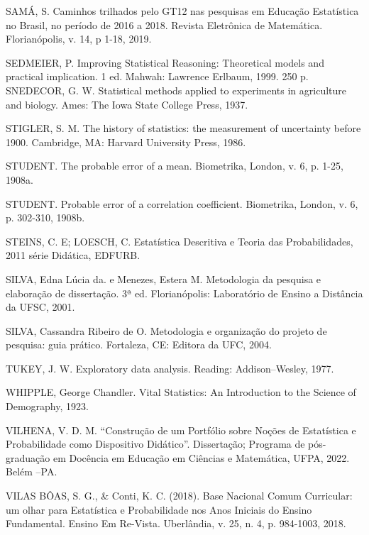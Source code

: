 SAMÁ, S. Caminhos trilhados pelo GT12 nas pesquisas em Educação Estatística no Brasil, no período de 2016 a 2018. Revista Eletrônica de Matemática. Florianópolis, v. 14, p 1-18, 2019.\vskip0.3cm

SEDMEIER, P. Improving Statistical Reasoning: Theoretical models and practical implication. 1 ed. Mahwah: Lawrence Erlbaum, 1999. 250 p.\vskip0.3cm
SNEDECOR, G. W. Statistical methods applied to experiments in agriculture and biology. Ames: The Iowa State College Press, 1937. \vskip0.3cm

STIGLER, S. M. The history of statistics: the measurement of uncertainty before 1900. Cambridge, MA: Harvard University Press, 1986. \vskip0.3cm

STUDENT. The probable error of a mean. Biometrika, London, v. 6, p. 1-25, 1908a.\vskip0.3cm

STUDENT. Probable error of a correlation coefficient. Biometrika, London, v. 6, p. 302-310, 1908b.\vskip0.3cm

STEINS, C. E; LOESCH, C. Estatística Descritiva e Teoria das Probabilidades, 2011 série Didática, EDFURB.\vskip0.3cm

SILVA, Edna Lúcia da. e Menezes, Estera M. Metodologia da pesquisa e elaboração de dissertação. 3ª ed. Florianópolis: Laboratório de Ensino a Distância da UFSC, 2001.\vskip0.3cm

SILVA, Cassandra Ribeiro de O. Metodologia e organização do projeto de pesquisa: guia prático. Fortaleza, CE: Editora da UFC, 2004.\vskip0.3cm

TUKEY, J. W. Exploratory data analysis. Reading: Addison–Wesley, 1977.\vskip0.3cm

WHIPPLE, George Chandler. Vital Statistics: An Introduction to the Science of Demography, 1923. \vskip0.3cm

VILHENA, V. D. M. “Construção de um Portfólio sobre Noções de Estatística e Probabilidade como Dispositivo Didático”. Dissertação; Programa de pós-graduação em Docência em Educação em Ciências e Matemática, UFPA, 2022. Belém –PA.\vskip0.3cm

 VILAS BÔAS, S. G., \& Conti, K. C. (2018). Base Nacional Comum Curricular: um olhar para Estatística e Probabilidade nos Anos Iniciais do Ensino Fundamental. Ensino Em Re-Vista. Uberlândia, v. 25, n. 4, p. 984-1003, 2018. \vskip0.3cm







